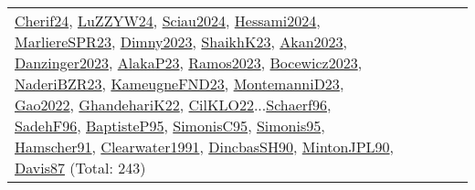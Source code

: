 {\begin{longtable}{p{3cm}r>{\raggedright\arraybackslash}p{6cm}>{\raggedright\arraybackslash}p{6cm}>{\raggedright\arraybackslash}p{8cm}}
\hyperref[detail:Cherif24]{Cherif24}, \hyperref[detail:LuZZYW24]{LuZZYW24}, \hyperref[detail:Sciau2024]{Sciau2024}, \hyperref[detail:Hessami2024]{Hessami2024}, \hyperref[detail:MarliereSPR23]{MarliereSPR23}, \hyperref[detail:Dimny2023]{Dimny2023}, \hyperref[detail:ShaikhK23]{ShaikhK23}, \hyperref[detail:Akan2023]{Akan2023}, \hyperref[detail:Danzinger2023]{Danzinger2023}, \hyperref[detail:AlakaP23]{AlakaP23}, \hyperref[detail:Ramos2023]{Ramos2023}, \hyperref[detail:Bocewicz2023]{Bocewicz2023}, \hyperref[detail:NaderiBZR23]{NaderiBZR23}, \hyperref[detail:KameugneFND23]{KameugneFND23}, \hyperref[detail:MontemanniD23]{MontemanniD23}, \hyperref[detail:Gao2022]{Gao2022}, \hyperref[detail:GhandehariK22]{GhandehariK22}, \hyperref[detail:CilKLO22]{CilKLO22}...\hyperref[detail:Schaerf96]{Schaerf96}, \hyperref[detail:SadehF96]{SadehF96}, \hyperref[detail:BaptisteP95]{BaptisteP95}, \hyperref[detail:SimonisC95]{SimonisC95}, \hyperref[detail:Simonis95]{Simonis95}, \hyperref[detail:Hamscher91]{Hamscher91}, \hyperref[detail:Clearwater1991]{Clearwater1991}, \hyperref[detail:DincbasSH90]{DincbasSH90}, \hyperref[detail:MintonJPL90]{MintonJPL90}, \hyperref[detail:Davis87]{Davis87} (Total: 243)\\

\end{longtable}}
